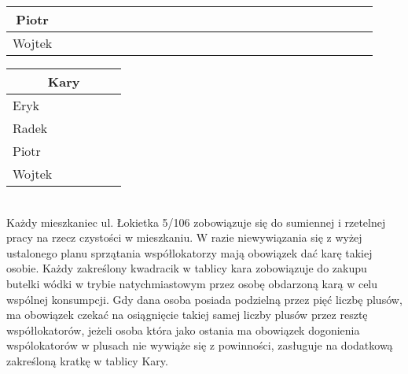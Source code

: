 \documentclass[a4paper, 11pt]{article}
\begin{document}
\begin{table}[ht]
\begin{tabular}{|c|c|c|c|c|c|c|c|c|c|c|c|c|c|c|c|c|c|c|c|c|c|c|c|c|c|c|c|c|c|}
\hline
\multicolumn{5}{|p{3cm}||}{Piotr} & \multicolumn{1}{|p{2,6mm}|}{} & \multicolumn{1}{|p{2,6mm}|}{} & \multicolumn{1}{|p{2,6mm}|}{} & \multicolumn{1}{|p{2,6mm}|}{} & & \multicolumn{1}{||p{2,6mm}|}{} & \multicolumn{1}{|p{2,6mm}|}{} & \multicolumn{1}{|p{2,6mm}|}{} & \multicolumn{1}{|p{2,6mm}|}{} & & \multicolumn{1}{||p{2,6mm}|}{} & \multicolumn{1}{|p{2,6mm}|}{} & \multicolumn{1}{|p{2,6mm}|}{} & \multicolumn{1}{|p{2,6mm}|}{} & & \multicolumn{1}{||p{2,6mm}|}{} & \multicolumn{1}{|p{2,6mm}|}{} & \multicolumn{1}{|p{2,6mm}|}{} & \multicolumn{1}{|p{2,6mm}|}{} & &\multicolumn{1}{||p{2,6mm}|}{} & \multicolumn{1}{|p{2,6mm}|}{} & \multicolumn{1}{|p{2,6mm}|}{} & \multicolumn{1}{|p{2,6mm}|}{} &\\
\hline
\multicolumn{5}{|p{3cm}||}{Wojtek} & \multicolumn{1}{|p{2,6mm}|}{} & \multicolumn{1}{|p{2,6mm}|}{} & \multicolumn{1}{|p{2,6mm}|}{} & \multicolumn{1}{|p{2,6mm}|}{} & & \multicolumn{1}{||p{2,6mm}|}{} & \multicolumn{1}{|p{2,6mm}|}{} & \multicolumn{1}{|p{2,6mm}|}{} & \multicolumn{1}{|p{2,6mm}|}{} & & \multicolumn{1}{||p{2,6mm}|}{} & \multicolumn{1}{|p{2,6mm}|}{} & \multicolumn{1}{|p{2,6mm}|}{} & \multicolumn{1}{|p{2,6mm}|}{} & & \multicolumn{1}{||p{2,6mm}|}{} & \multicolumn{1}{|p{2,6mm}|}{} & \multicolumn{1}{|p{2,6mm}|}{} & \multicolumn{1}{|p{2,6mm}|}{} & &\multicolumn{1}{||p{2,6mm}|}{} & \multicolumn{1}{|p{2,6mm}|}{} & \multicolumn{1}{|p{2,6mm}|}{} & \multicolumn{1}{|p{2,6mm}|}{} &\\
\hline
\end{tabular}
\end{table}

\begin{table}[ht]
\begin{tabular}{|p{}||c|c|c|c|c|}
\hline
\multicolumn{6}{|c|}{\textbf{Kary}}\\
\hline
\hline
Eryk & & & & & \\
\hline
Radek & & & & &\\
\hline
Piotr & & & & &\\
\hline
Wojtek & & & & &\\
\hline
\end{tabular}
\end{table}

 \\
Każdy mieszkaniec ul. Łokietka 5/106 zobowiązuje się do sumiennej i rzetelnej pracy na rzecz czystości w mieszkaniu. W razie niewywiązania się z wyżej ustalonego planu sprzątania współlokatorzy mają obowiązek dać karę takiej osobie. Każdy zakreślony kwadracik w tablicy kara zobowiązuje do zakupu butelki wódki w trybie natychmiastowym przez osobę obdarzoną karą w celu wspólnej konsumpcji. Gdy dana osoba posiada podzielną przez pięć liczbę plusów, ma obowiązek czekać na osiągnięcie takiej samej liczby plusów przez resztę współlokatorów, jeżeli osoba która jako ostania ma obowiązek dogonienia wspólokatorów w plusach nie wywiąże się z powinności, zasługuje na dodatkową zakreśloną kratkę w tablicy Kary.
\newline
\end{document}
